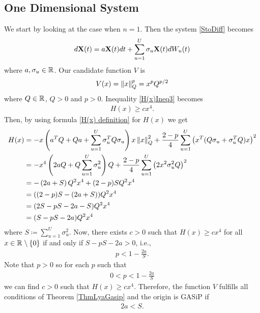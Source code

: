 \documentclass[a4paper,12pt,twoside,BCOR=10mm]{scrbook}
\begin{document}
\subsection{One Dimensional System}
We start by looking at the case when $n = 1$. Then the system \eqref{StoDiff} becomes
\begin{align}\label{SDE 1d}
    d\mathbf{X}(t) = a\mathbf{X}(t)dt + \sum_{u = 1}^U \sigma_u \mathbf{X}(t) dW_u(t)
\end{align}
where $a, \sigma_u \in \mathbb{R}^{}$. Our candidate function $V$ is
\begin{align*}
    V(x) = \left\lVert x\right\rVert_Q^p = x^p Q^{p/2}
\end{align*}
where $Q\in \mathbb{R}^{}$, $Q > 0$ and $p > 0$. Inequality \eqref{H(x)Ineq3} becomes
\fi
\begin{align*}
    H(x) \geq cx^4.
\end{align*}
Then, by using formula \eqref{H(x) definition} for $H(x)$ we get
\begin{align*}
    H(x) &= -x\left(a^T Q + Qa + \sum_{u = 1}^U \sigma_u^T Q \sigma_u \right)x \left\lVert x\right\rVert_{Q}^{2} + \frac{2 - p}{4} \sum_{u = 1}^U \left(x^T (Q\sigma_u + \sigma_u^T Q) x\right)^2\\
    &= -x^4\left(2a Q + Q\sum_{u = 1}^U \sigma_u^2\right)Q + \frac{2 - p}{4} \sum_{u = 1}^U\left(2x^2\sigma_u^2 Q\right)^2\\
    &= -\left(2a + S\right) Q^2x^4 + (2 - p)SQ^2x^4\\
    &= ((2-p)S - (2a + S))Q^2 x^4\\
    &= (2S - pS - 2a - S) Q^2 x^4\\
    &= (S - pS - 2a)Q^2 x^4
\end{align*}
where $S \coloneqq \sum\limits_{u = 1}^U \sigma_u^2$. Now, there exists $c > 0$ such that $H(x) \geq cx^4$ for all $x \in \mathbb{R}^{}\setminus \{0\}$ if and only if $S - pS - 2a > 0$, i.e.,
\begin{align*}
    p < 1 - \frac{2a}{S}.
\end{align*}
Note that $p > 0$ so for each $p$ such that
\begin{align*}
    0 < p < 1 - \frac{2a}{S}
\end{align*}
we can find $c > 0$ such that $H(x) \geq cx^4$. Therefore, the function $V$ fulfills all conditions of Theorem \ref{ThmLyaGasip} and the origin is GASiP if
\begin{align*}
    2a < S.
\end{align*}
\end{document}
